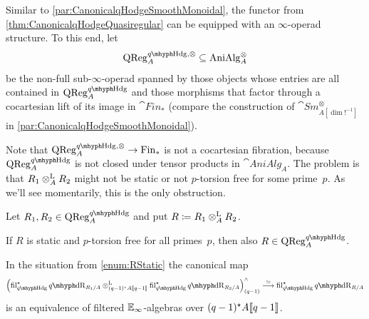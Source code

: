 \documentclass[DIV=12,numbers=enddot,leqno,bibliography=totoc]{scrartcl}
\begin{document}
	\begin{numpar}[Monoidality.]
		Similar to \cref{par:CanonicalqHodgeSmoothMonoidal}, the functor from \cref{thm:CanonicalqHodgeQuasiregular} can be equipped with an $\infty$-operad structure. To this end, let
		\begin{equation*}
			\cat{QReg}_A^{\qHodge,\otimes}\subseteq \cat{AniAlg}_A^{\otimes}
		\end{equation*}
		be the non-full sub-$\infty$-operad spanned by those objects whose entries are all contained in $\cat{QReg}_A^{\qHodge}$ and those morphisms that factor through a cocartesian lift of its image in $\cat{Fin}_*$ (compare the construction of $\cat{Sm}_{A[\dim!^{-1}]}^{\otimes}$ in \cref{par:CanonicalqHodgeSmoothMonoidal}).
		
		Note that $\cat{QReg}_A^{\qHodge,\otimes}\rightarrow \cat{Fin}_*$ is not a cocartesian fibration, because $\cat{QReg}_A^{\qHodge}$ is not closed under tensor products in $\cat{AniAlg}_A$. The problem is that $R_1\otimes^{\mathrm{L}}_A R_2$ might not be static or not $p$-torsion free for some prime~$p$. As we'll see momentarily, this is the only obstruction.
	\end{numpar}
	\begin{lem}\label{lem:qHodgeQuasiregularSymmetricMonoidal}
		Let $R_1,R_2\in\cat{QReg}_A^{\qHodge}$ and put $R\coloneqq R_1\lotimes_AR_2$.
		\begin{alphanumerate}
			\item If $R$ is static and $p$-torsion free for all primes~$p$, then also $R\in\cat{QReg}_A^{\qHodge}$.\label{enum:RStatic}
			\item In the situation from \cref{enum:RStatic} the canonical map\label{enum:qHodgeQuasiregularSymmetricMonoidal}
			\begin{equation*}
				\Bigl(\fil_{\qHodge}^\star\qdeRham_{R_1/A}\lotimes_{(q-1)^\star A\qpower}\fil_{\qHodge}^\star\qdeRham_{R_2/A}\Bigr)_{(q-1)}^\complete\overset{\simeq}{\longrightarrow}\fil_{\qHodge}^\star\qdeRham_{R/A}
			\end{equation*}
			is an equivalence of filtered $\mathbb{E}_\infty$-algebras over $(q-1)^\star A\llbracket q-1\rrbracket$.
		\end{alphanumerate}
	\end{lem}
\end{document}
